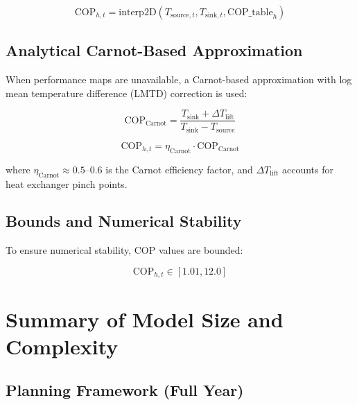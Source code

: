 \documentclass[11pt]{article}
\begin{document}
\begin{equation}
\text{COP}_{h,t} = \text{interp2D}\left( T_{\text{source},t}, T_{\text{sink},t}, \text{COP\_table}_h \right)
\label{eq:cop_interp}
\end{equation}

\subsection{Analytical Carnot-Based Approximation}

When performance maps are unavailable, a Carnot-based approximation with log mean temperature difference (LMTD) correction is used:

\begin{equation}
\text{COP}_{\text{Carnot}} = \frac{T_{\text{sink}} + \Delta T_{\text{lift}}}{T_{\text{sink}} - T_{\text{source}}}
\label{eq:cop_carnot}
\end{equation}

\begin{equation}
\text{COP}_{h,t} = \eta_{\text{Carnot}} \cdot \text{COP}_{\text{Carnot}}
\label{eq:cop_analytical}
\end{equation}

where $\eta_{\text{Carnot}} \approx 0.5$--$0.6$ is the Carnot efficiency factor, and $\Delta T_{\text{lift}}$ accounts for heat exchanger pinch points.

\subsection{Bounds and Numerical Stability}

To ensure numerical stability, COP values are bounded:

\begin{equation}
\text{COP}_{h,t} \in [1.01, 12.0]
\label{eq:cop_bounds}
\end{equation}

\section{Summary of Model Size and Complexity}

\subsection{Planning Framework (Full Year)}
\end{document}
